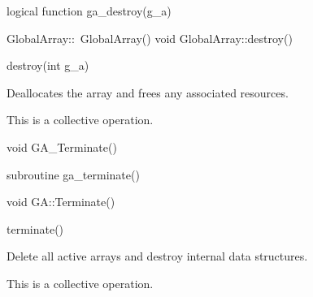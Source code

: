 \documentclass[12pt]{article}
\begin{document}
\begin{fapi}
\begin{fcode}
logical function ga_destroy(g_a)  
\end{fcode}
\begin{funcargs}
\end{funcargs}
\end{fapi}

\begin{cxxapi}
\begin{cxxcode}
GlobalArray::~GlobalArray()
void GlobalArray::destroy()
\end{cxxcode}
\end{cxxapi}

\begin{pyapi}
\begin{pycode}
destroy(int g_a)
\end{pycode}
\end{pyapi}

\begin{desc}

Deallocates the array and frees any associated resources.

This is a collective operation.

\end{desc}


\begin{capi}
\begin{ccode}
void GA_Terminate()
\end{ccode}
\end{capi}

\begin{fapi}
\begin{fcode}
subroutine ga_terminate()
\end{fcode}
\end{fapi}

\begin{cxxapi}
\begin{cxxcode}
void GA::Terminate()
\end{cxxcode}
\end{cxxapi}

\begin{pyapi}
\begin{pycode}
terminate()
\end{pycode}
\end{pyapi}

\begin{desc}

Delete all active arrays and destroy internal data structures.

This is a collective operation.

\end{desc}
\end{document}
